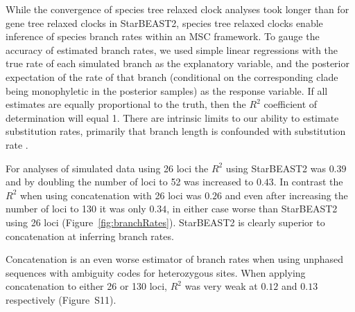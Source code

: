 \documentclass[12pt]{article}
\begin{document}
While the convergence of species tree relaxed clock analyses took longer than
for gene tree relaxed clocks in StarBEAST2, species tree relaxed clocks enable
inference of species branch rates within an MSC framework. To gauge the
accuracy of estimated branch rates, we used simple linear regressions with the
true rate of each simulated branch as the explanatory variable, and the
posterior expectation of the rate of that branch (conditional on the
corresponding clade being monophyletic in the posterior samples) as the
response variable. If all estimates are equally proportional to the truth,
then the $R^2$ coefficient of determination will equal 1. There are intrinsic
limits to our ability to estimate substitution rates, primarily that branch
length is confounded with substitution rate \citep{Thorne01092002}.

For analyses of simulated data using 26 loci the $R^2$ using StarBEAST2 was
$0.39$ and by doubling the number of loci to 52 was increased to $0.43$. In
contrast the $R^2$ when using concatenation with 26 loci was $0.26$ and even after
increasing the number of loci to 130 it was only $0.34$, in either case worse
than StarBEAST2 using 26 loci (Figure~\ref{fig:branchRates}). StarBEAST2 is
clearly superior to concatenation at inferring branch rates.

Concatenation is an even worse estimator of branch rates when using unphased
sequences with ambiguity codes for heterozygous sites. When applying
concatenation to either 26 or 130 loci, $R^2$ was very weak at $0.12$ and
$0.13$ respectively (Figure~S11).
\end{document}
